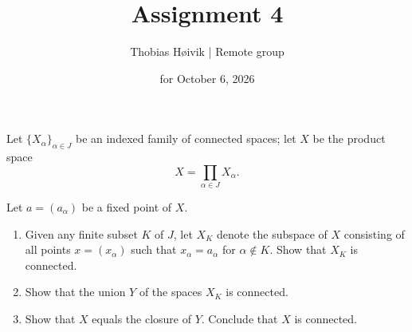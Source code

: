 

\usepackage{tikz}
\usepackage{tikz-cd}

\DeclareMathOperator{\id}{\operatorname{id}}

\title{\huge{Assignment 4}}
\author{\LARGE{Thobias Høivik | Remote group}}
\date{for October 6, 2026}


\maketitle

\begin{prob*}[Munkres 23.10]
    Let $\{X_\alpha\}_{\alpha \in J}$ 
    be an indexed family of 
    connected spaces; 
    let $X$ be the product space 
    \[
        X = \prod_{\alpha \in J} X_\alpha. 
    \]

    Let $a = (a_\alpha)$ be a fixed point 
    of $X$. 

    \begin{enumerate}[label=(\alph*)]
        \item Given any finite subset 
            $K$ of $J$, let $X_K$ 
            denote the subspace of $X$ 
            consisting of all 
            points $x = (x_\alpha)$ 
            such that $x_\alpha = a_\alpha$ 
            for $\alpha \not\in K$. 
            Show that $X_K$ is connected. 
        \item Show that the union $Y$
            of the spaces $X_K$ is connected. 
        \item Show that $X$ equals the 
            closure of $Y$. Conclude 
            that $X$ is connected. 
    \end{enumerate}
\end{prob*}
